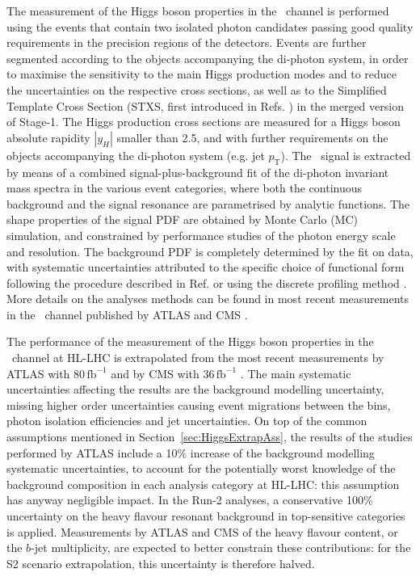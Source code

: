 \label{sec:Hgammagamma}

The measurement of the Higgs boson properties in the \Hyy\ channel is performed using the events that contain two isolated photon candidates passing good quality requirements in the precision regions of the detectors. Events are further segmented according to the objects accompanying the di-photon system, in order to maximise the sensitivity to the main Higgs production modes and to reduce the uncertainties on the respective cross sections, as well as to the Simplified Template Cross Section (STXS, first introduced in Refs. \cite{deFlorian:2016spz,Badger:2016bpw}) in the merged version of Stage-1.
The Higgs production cross sections are measured for a Higgs boson absolute rapidity $|y_H|$ smaller than 2.5, and with further requirements on the objects accompanying the di-photon system (e.g. jet $p_\mathrm{T}$).
The \Hyy\ signal is extracted by means of a combined signal-plus-background fit of the di-photon invariant mass spectra in the various event categories, where both the continuous background and the signal resonance are parametrised by analytic functions. The shape properties of the signal PDF are obtained by Monte Carlo (MC) simulation, and constrained by performance studies of the photon energy scale and resolution. The background PDF is completely determined by the fit on data, with systematic uncertainties attributed to the specific choice of functional form following the procedure described in Ref. \cite{Aad:2012tfa} or using the discrete profiling method \cite{Dauncey:2014xga}. More details on the analyses methods can be found in most recent measurements in the \Hyy\ channel published by ATLAS \cite{ATLAS:2018uso} and CMS \cite{Sirunyan:2018ouh}. 

The performance of the measurement of the Higgs boson properties in the \Hyy\ channel at HL-LHC is extrapolated from the most recent measurements by ATLAS with 80\,$\mathrm{fb}^{-1}$ \cite{ATLAS:2018uso} and by CMS with 36\,$\mathrm{fb}^{-1}$ \cite{Sirunyan:2018ouh}. The main systematic uncertainties affecting the results are the background modelling uncertainty,
missing higher order uncertainties
causing event migrations between the bins, photon isolation efficiencies and jet uncertainties.
%
On top of the common assumptions mentioned in Section~\ref{sec:HiggsExtrapAss}, the %
results of the studies performed by ATLAS include a 10\% increase of the background modelling systematic uncertainties, to account for the potentially worst knowledge of the background composition in each analysis category at HL-LHC: this assumption has anyway negligible impact.
%
In the Run-2 analyses, a conservative 100\% uncertainty on the heavy flavour resonant background in top-sensitive categories is applied. Measurements by ATLAS and CMS of the heavy flavour content, or the $b$-jet multiplicity, are expected to better constrain these contributions: for the S2 scenario extrapolation, this uncertainty is therefore halved.

